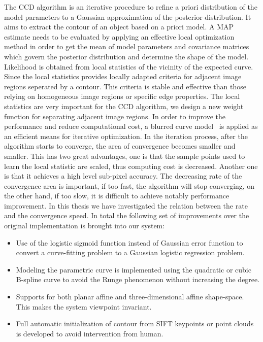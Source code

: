 The CCD algorithm is an iterative procedure to refine a priori distribution of the model parameters to a Gaussian
approximation of the posterior distribution. It aims to extract the
contour of an object based on a priori model. A MAP estimate needs to be
evaluated by applying an effective local optimization method in order to get
the mean of model parameters and covariance matrices which govern the
posterior distribution and determine the shape of the model. Likelihood is 
obtained from local statistics of the vicinity of the expected
curve. Since the local statistics provides locally adapted criteria for
adjacent image regions seperated by a contour. This criteria is stable
and effective than those relying on homogeneous image regions or
specific edge properties. The local statistics are very
important for the CCD algorithm, we design a new weight
function for separating adjacent image regions. 
 In order to improve the performance and
reduce computational cost, a blurred curve model~\cite{hanek2004contracting} is applied as an efficient means for
iterative optimization. In the iteration process, after the
algorithm starts to converge, the area of
convergence becomes smaller and smaller. This has two great
advantages, one is that the sample points used to learn the local statistic
are scaled, thus computing cost is decreased. Another one is that it
achieves a high level sub-pixel accuracy. The decreasing rate of the
convergence area is important, if too fast, the algorithm will stop
converging, on the other hand, if too slow, it is difficult to achieve
notably performance improvement. In this thesis we have investigated the relation between
the rate and the convergence speed. In total the following set of
improvements over the original implementation is brought into our system:
\begin{itemize}
\item Use of the logistic sigmoid function instead of Gaussian error
  function to convert a curve-fitting problem to a Gaussian logistic
  regression problem.
\item Modeling the parametric curve is implemented using the quadratic or
cubic B-spline curve  to avoid the Runge phenomenon without increasing
the degree.
\item Supports for both planar affine and three-dimensional affine
  shape-space. This makes the system viewpoint invariant.
\item Full automatic initialization of contour from SIFT keypoints or
  point clouds is developed to avoid
  intervention from human.
\end{itemize}

